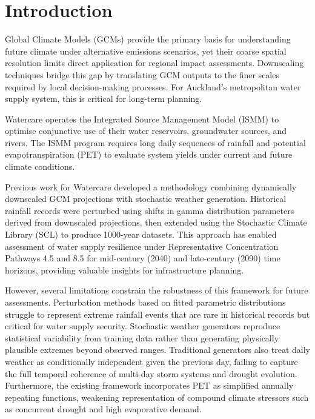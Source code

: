 \chapter{Introduction} \label{Section:Intro}

Global Climate Models (GCMs) provide the primary basis for understanding future climate under 
alternative emissions scenarios, yet their coarse spatial resolution 
limits direct application for regional impact assessments. Downscaling techniques 
bridge this gap by translating GCM outputs to the finer scales required by local 
decision-making processes. For Auckland's metropolitan water supply system, this 
is critical for long-term planning. 

Watercare operates the Integrated Source Management Model (ISMM) 
to optimise conjunctive use of their water reservoirs, groundwater sources, and rivers. The 
ISMM program requires long daily sequences of rainfall and potential 
evapotranspiration (PET) to evaluate system yields under current and future climate conditions.

Previous work for Watercare developed a methodology combining dynamically downscaled GCM 
projections with stochastic weather generation. Historical rainfall records were perturbed 
using shifts in gamma distribution parameters derived from downscaled projections, then 
extended using the Stochastic Climate Library (SCL) to produce 1000-year datasets. 
This approach has enabled assessment of water supply resilience under Representative 
Concentration Pathways 4.5 and 8.5 for mid-century (2040) and late-century (2090) time 
horizons, providing valuable insights for infrastructure planning.

However, several limitations constrain the robustness of this framework for future assessments. 
Perturbation methods based on fitted parametric distributions struggle to represent extreme 
rainfall events that are rare in historical records but critical for water supply security. 
Stochastic weather generators reproduce statistical variability from training data rather than 
generating physically plausible extremes beyond observed ranges. Traditional generators also 
treat daily weather as conditionally independent given the previous day, failing to capture 
the full temporal coherence of multi-day storm systems and drought evolution. Furthermore, 
the existing framework incorporates PET as simplified annually repeating functions, weakening 
representation of compound climate stressors such as concurrent drought and high evaporative 
demand.

